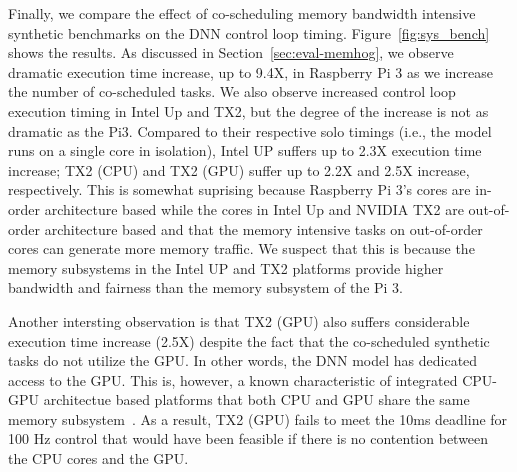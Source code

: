 Finally, we compare the effect of co-scheduling memory bandwidth
intensive synthetic benchmarks on the DNN control loop timing. 
Figure~\ref{fig:sys_bench} shows the results.
As discussed in 
Section~\ref{sec:eval-memhog}, we observe dramatic execution time
increase, up to 9.4X, in Raspberry Pi 3 as we increase the number of
co-scheduled tasks. We also observe increased control loop execution
timing in Intel Up and TX2, but the degree of the increase is not as
dramatic as the Pi3. Compared to their respective solo timings (i.e.,
the model runs on a single core in isolation), Intel UP suffers up to
2.3X execution time increase; TX2 (CPU) and TX2 (GPU) suffer up to
2.2X and 2.5X increase, respectively. This is somewhat suprising
because Raspberry Pi 3's cores are in-order architecture based while
the cores in Intel Up and NVIDIA TX2 are out-of-order architecture
based and that the memory intensive tasks on out-of-order cores can
generate more memory traffic. We suspect that this is because the
memory subsystems in the Intel UP and TX2 platforms provide higher
bandwidth and fairness than the memory subsystem of the Pi 3.

Another intersting observation is that TX2 (GPU) also suffers
considerable execution time increase (2.5X) despite the fact that the
co-scheduled synthetic tasks do not utilize the GPU. In other words,
the DNN model has dedicated access to the GPU. This is, however, a
known characteristic of integrated CPU-GPU architectue based
platforms that both CPU and GPU share the same memory
subsystem~\cite{Ali2017}. As a result, TX2 (GPU) fails to meet the
10ms deadline for 100 Hz control that would have been feasible if
there is no contention between the CPU cores and the GPU.


